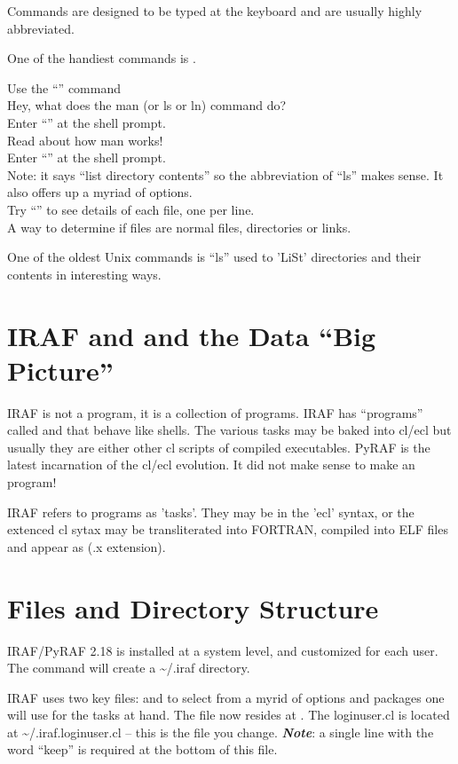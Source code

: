 Commands are designed to be typed at the keyboard and are usually
highly abbreviated. 

One of the handiest commands is .

\example Use the ``'' command \\
\prose Hey, what does the man (or ls or ln) command do?\\
\exercise Enter ``'' at the shell prompt.\\
\takeaway Read about how man works!\\
\exercise[-b] Enter ``'' at the shell prompt.\\
\takeaway Note: it says ``list directory contents'' so the abbreviation
of ``ls'' makes sense. It also offers up a myriad of options.\\
\exercise[-c] Try ``'' to see details of each file, one per line.\\
\takeaway A way to determine if files are normal files, directories or
links.

One of the oldest Unix commands is ``ls'' used to 'LiSt' directories and
their contents in interesting ways.

\section{IRAF and  and the Data ``Big Picture''}

IRAF is not a program, it is a collection of programs. IRAF has
``programs'' called  and  that behave like
shells. The various tasks may be baked into cl/ecl but usually they are
either other cl scripts of compiled executables. PyRAF is the latest
incarnation of the cl/ecl evolution. It did not make sense to make an
 program!

IRAF refers to programs as 'tasks'. They may be in the 'ecl' syntax,
or the extenced cl sytax may be transliterated into FORTRAN, compiled
into ELF files and appear as  (.x extension).


\section{Files and Directory Structure}

IRAF/PyRAF 2.18 is installed at a system level, and customized for each user.
The  command will create a {\textasciitilde}/.iraf directory.

IRAF uses two key files:  and  to select from a myrid
of options and packages one will use for the tasks at hand. The 
file now resides at . The loginuser.cl is located
at {\textasciitilde}/.iraf.loginuser.cl -- this is the file you change.
\textbf{\emph{Note}}: a single line with the word ``keep'' is required at the bottom
of this file.

